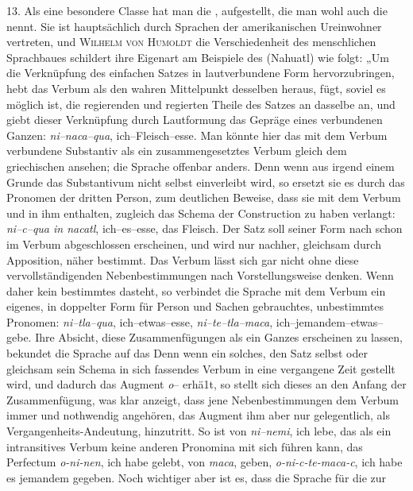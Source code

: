 \largerpage[-1]\label{IV.III.II.4.13}13. Als eine besondere Classe hat man die ,  aufgestellt, die man wohl auch die  nennt. Sie ist hauptsächlich durch Sprachen der amerikanischen Ureinwohner vertreten, und \textsc{Wilhelm von Humoldt}  die Verschiedenheit des menschlichen Sprachbaues  schildert ihre Eigenart am Beispiele des  (Nahuatl) wie folgt: „Um die Verknüpfung des einfachen Satzes in  lautverbundene Form hervorzubringen, hebt  das Verbum als den wahren Mittelpunkt desselben heraus, fügt, soviel es möglich ist, die regierenden und regierten Theile des Satzes an dasselbe an, und giebt dieser Verknüpfung durch Lautformung das Gepräge eines verbundenen Ganzen: \textit{ni–naca–qua}, ich–Fleisch–esse. Man könnte hier das mit dem Verbum verbundene Substantiv als ein zusammengesetztes Verbum gleich dem griechischen  ansehen; \label{sp.355} die Sprache  offenbar anders. Denn wenn aus irgend einem Grunde das Substantivum nicht selbst einverleibt wird, so ersetzt sie es durch das Pronomen der dritten Person, zum deutlichen Beweise, dass sie mit dem Verbum und in ihm enthalten, zugleich das Schema der Construction zu haben verlangt: \textit{ni–c–qua in nacatl}, ich–es–esse, das Fleisch. Der Satz soll seiner Form nach schon im Verbum abgeschlossen erscheinen, und wird nur nachher, gleichsam durch Apposition, näher bestimmt. Das Verbum lässt sich gar nicht ohne diese vervollständigenden Nebenbestimmungen nach  Vorstellungsweise denken. Wenn daher kein bestimmtes  dasteht, so verbindet die Sprache mit dem Verbum ein eigenes, in doppelter Form für Person und Sachen gebrauchtes, unbestimmtes Pronomen: \textit{ni–tla–qua}, ich–etwas–esse, \textit{ni–te–tla–maca}, ich–jemandem–etwas–gebe. Ihre Absicht, diese Zusammenfügungen als ein Ganzes erscheinen zu lassen, bekundet die Sprache auf das  Denn wenn ein solches, den Satz selbst oder gleichsam sein Schema in sich fassendes Verbum in eine vergangene Zeit gestellt wird, und dadurch das Augment \label{fp.337} \textit{o}– erhä1t, so stellt sich dieses an den Anfang der Zusammenfügung, was klar anzeigt, dass jene Nebenbestimmungen dem Verbum immer und nothwendig angehören, das Augment ihm aber nur gelegentlich, als Vergangenheits-Andeutung, hinzutritt. So ist von \textit{ni–nemi}, ich lebe, das als ein intransitives Verbum keine anderen Pronomina mit sich führen \label{fp.206} kann, das Perfectum \textit{o-ni-nen}, ich habe gelebt, von \textit{maca}, geben, \textit{o-ni-c-te-maca-c}, ich habe es jemandem gegeben. Noch wichtiger aber ist es, dass die Sprache für die zur 